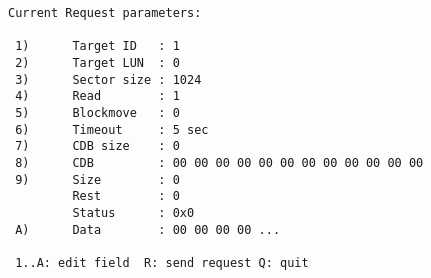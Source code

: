 \begin{screendump}
  \begin{verbatim}
Current Request parameters:

 1)      Target ID   : 1
 2)      Target LUN  : 0
 3)      Sector size : 1024
 4)      Read        : 1
 5)      Blockmove   : 0
 6)      Timeout     : 5 sec
 7)      CDB size    : 0
 8)      CDB         : 00 00 00 00 00 00 00 00 00 00 00 00
 9)      Size        : 0
         Rest        : 0
         Status      : 0x0
 A)      Data        : 00 00 00 00 ...

 1..A: edit field  R: send request Q: quit
  \end{verbatim}
\end{screendump}
